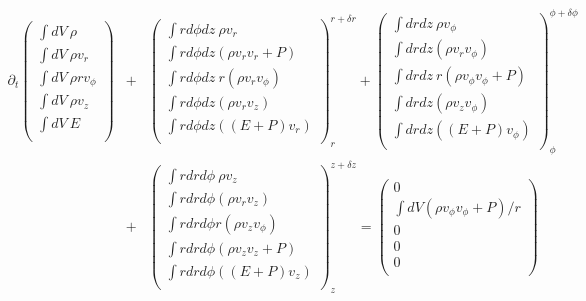 \documentclass[landscape]{article}
\begin{document}
\begin{eqnarray*}
  \partial_t  \left(
  \begin{array}{c}
    \int dV \ \rho\\
    \int dV \ \rho v_r\\
    \int dV \ \rho r v_{\phi}\\
    \int dV \ \rho v_z\\
    \int dV \ E\\
  \end{array}
  \right)
  &+&   \left(
  \begin{array}{c}
    \int r d\phi dz \ \rho v_r\ \\
    \int r d\phi dz (\rho v_r v_r+ P)\\
    \int r d\phi dz \ r(\rho v_r v_{\phi} )\\
    \int r d\phi dz (\rho v_r v_z)\\
    \int r d\phi dz ((E+P)v_r)\\
    \end{array}
  \right)^{r+\delta r}_r + \left(
    \begin{array}{c}
      \int dr dz \ \rho v_{\phi}\\
      \int dr dz (\rho v_r v_{\phi} )\\
      \int dr dz \ r(\rho v_{\phi} v_{\phi}  + P )\\
      \int dr dz (\rho v_z v_{\phi} )\\
      \int dr dz ((E+P)v_{\phi})\\
    \end{array}
    \right)^{\phi + \delta \phi}_{\phi}\\
    &+& \left(
    \begin{array}{c}
      \int r dr d \phi \ \rho v_z\\
      \int r dr d \phi (\rho v_r v_z )\\
      \int r dr d \phi r(\rho v_z v_{\phi} )\\
      \int r dr d \phi (\rho v_z v_z + P)\\
      \int r dr d \phi ((E+P)v_z)\\
    \end{array}
    \right)^{z+\delta z}_{z} 
    =\left(
    \begin{array}{c}
      0\\
      \int dV (\rho v_{\phi} v_{\phi} +P)/r\\
      0\\
      0\\
      0\\
    \end{array}
    \right)
\end{eqnarray*}
\end{document}
